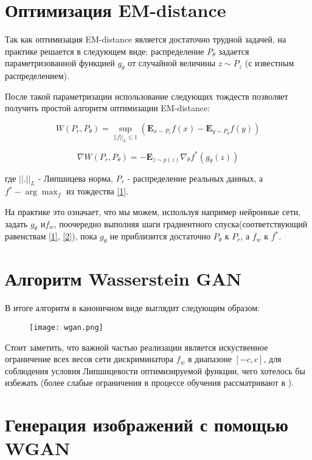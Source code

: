 \documentclass{article}
\begin{document}
\section{Оптимизация EM-distance}

Так как оптимизация EM-distance является достаточно трудной задачей, на практике решается в следующем виде: распределение $P_{\theta}$ задается параметризованной функцией $g_\theta$ от случайной величины $z \sim P_z$ (с известным распределением).

После такой параметризации использование следующих тождеств позволяет получить простой алгоритм оптимизации EM-distance:

$$W(P_r, P_{\theta}) = \sup_{||f||_L \leq 1} (\mathbf{E}_{x\sim P_r}f(x) - \mathbf{E}_{y\sim P_{\theta}}f(y))$$  

$$\nabla W(P_r, P_{\theta}) = -\mathbf{E}_{z \sim p(z)} \nabla_\theta f^*(g_{\theta}(z))$$ 


где $||.||_L$ - Липшицева норма, $P_r$ - распределение реальных данных, а $f^* - \arg\max_f$ из тождества \eqref{1}.


На практике это означает, что мы можем, используя например нейронные сети, задать $g_\theta$ и$f_w$, поочередно выполняя шаги градиентного спуска(соответствующий равенствам \eqref{1}, \eqref{2}), пока $g_\theta$ не приблизится достаточно $P_\theta$ к  $P_r$, а $f_w$ к $f^*$.

\section{Алгоритм Wasserstein GAN}

 В итоге алгоритм в каноничном виде выглядит следующим образом:
 
\begin{figure}[h!]
\centering
\texttt{[image: wgan.png]}
\end{figure}




Стоит заметить, что важной частью реализации является искуственное ограничение всех весов сети дискриминатора $f_w$ в диапазоне $[-c,c]$, для соблюдения условия Липшицевости оптимизируемой функции, чего хотелось бы избежать (более слабые ограничения в процессе обучения рассматривают в \cite{wgan-improvement}).

\newpage 

\section{Генерация изображений с помощью WGAN}
\end{document}
